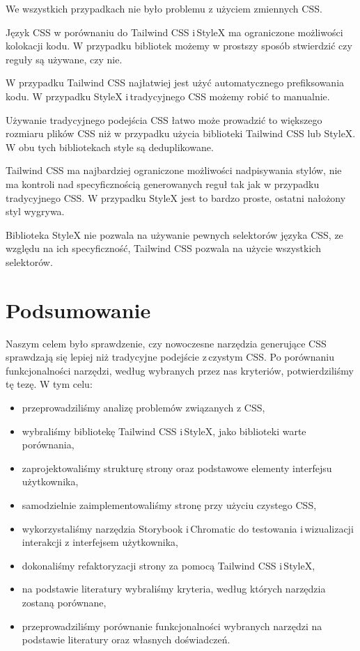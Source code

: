 \documentclass[a4paper,12pt]{book} %
\renewcommand{\chaptermark}[1]{\markboth{#1}{}}
\begin{document}
We wszystkich przypadkach nie było problemu z użyciem zmiennych CSS.

Język CSS w porównaniu do Tailwind CSS i\,StyleX ma ograniczone możliwości kolokacji kodu. W przypadku bibliotek możemy w prostszy sposób stwierdzić czy reguły są używane, czy nie.

W przypadku Tailwind CSS najłatwiej jest użyć automatycznego prefiksowania kodu. W przypadku StyleX i\,tradycyjnego CSS możemy robić to manualnie.

Używanie tradycyjnego podejścia CSS łatwo może prowadzić to większego rozmiaru plików CSS niż w przypadku użycia biblioteki Tailwind CSS lub StyleX. W obu tych bibliotekach style są deduplikowane.


Tailwind CSS ma najbardziej ograniczone możliwości nadpisywania stylów, nie ma kontroli nad specyficznością generowanych reguł tak jak w przypadku tradycyjnego CSS. W przypadku StyleX jest to bardzo proste, ostatni nałożony styl wygrywa.

Biblioteka StyleX nie pozwala na używanie pewnych selektorów języka CSS, ze względu na ich specyficzność, Tailwind CSS pozwala na użycie wszystkich selektorów.


\chapter*{Podsumowanie} %
\chaptermark{Podsumowanie}
Naszym celem było sprawdzenie, czy nowoczesne narzędzia generujące CSS sprawdzają się lepiej niż tradycyjne podejście z\,czystym CSS. Po porównaniu funkcjonalności narzędzi, według wybranych przez nas kryteriów, potwierdziliśmy tę tezę. W tym celu:

\begin{itemize}
  \item przeprowadziliśmy analizę problemów związanych z CSS,
  \item wybraliśmy bibliotekę Tailwind CSS i\,StyleX, jako biblioteki warte porównania,
  \item zaprojektowaliśmy strukturę strony oraz podstawowe elementy interfejsu użytkownika,
  \item samodzielnie zaimplementowaliśmy stronę przy użyciu czystego CSS,
  \item wykorzystaliśmy narzędzia Storybook i\,Chromatic do testowania i\,wizualizacji interakcji z interfejsem użytkownika,
  \item dokonaliśmy refaktoryzacji strony za pomocą Tailwind CSS i\,StyleX,
  \item na podstawie literatury wybraliśmy kryteria, według których narzędzia zostaną porównane,
  \item przeprowadziliśmy porównanie funkcjonalności wybranych narzędzi na podstawie literatury oraz własnych doświadczeń.
\end{itemize}
\end{document}
